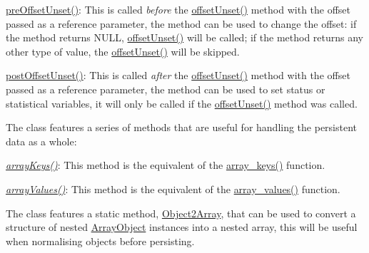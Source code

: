 \begin{DoxyItemize}
\item {\ttfamily \hyperlink{class_ontology_wrapper_1_1_container_object_ae9f60cec5e7e40aed32c51dd7efa0429}{pre\-Offset\-Unset()}}\-: This is called {\itshape before} the \hyperlink{class_ontology_wrapper_1_1_container_object_a6aec41ee5dafbd52a6e9963eb49f3e7e}{offset\-Unset()} method with the offset passed as a reference parameter, the method can be used to change the offset\-: if the method returns {\ttfamily N\-U\-L\-L}, \hyperlink{class_ontology_wrapper_1_1_container_object_a6aec41ee5dafbd52a6e9963eb49f3e7e}{offset\-Unset()} will be called; if the method returns any other type of value, the \hyperlink{class_ontology_wrapper_1_1_container_object_a6aec41ee5dafbd52a6e9963eb49f3e7e}{offset\-Unset()} will be skipped. 
\item {\ttfamily \hyperlink{class_ontology_wrapper_1_1_container_object_ada715084328ddac15b67491ea7c8e8cb}{post\-Offset\-Unset()}}\-: This is called {\itshape after} the \hyperlink{class_ontology_wrapper_1_1_container_object_a6aec41ee5dafbd52a6e9963eb49f3e7e}{offset\-Unset()} method with the offset passed as a reference parameter, the method can be used to set status or statistical variables, it will only be called if the \hyperlink{class_ontology_wrapper_1_1_container_object_a6aec41ee5dafbd52a6e9963eb49f3e7e}{offset\-Unset()} method was called. 
\end{DoxyItemize}

The class features a series of methods that are useful for handling the persistent data as a whole\-:


\begin{DoxyItemize}
\item {\itshape \hyperlink{class_ontology_wrapper_1_1_container_object_ae27d07c2dcb4b4e95a167ef9fa6a419a}{array\-Keys()}}\-: This method is the equivalent of the \hyperlink{}{array\-\_\-keys()} function. 
\item {\itshape \hyperlink{class_ontology_wrapper_1_1_container_object_a65780ec62aa8b6e5f699be556f9e316f}{array\-Values()}}\-: This method is the equivalent of the \hyperlink{}{array\-\_\-values()} function. 
\end{DoxyItemize}

The class features a static method, \hyperlink{class_ontology_wrapper_1_1_container_object_a0af6d7a3fcaeeb50be636280e95bc2db}{Object2\-Array}, that can be used to convert a structure of nested \hyperlink{}{Array\-Object} instances into a nested array, this will be useful when normalising objects before persisting.

